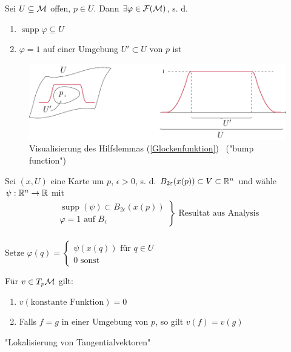 \begin{hlem}
Sei $U \subseteq \mathcal{M}$ offen, $p \in U$. Dann $\exists \varphi \in \mathcal{F}(\mathcal{M})$, s. d. 
\begin{enumerate}\label{Glockenfunktion}
\item$\operatorname{supp}\varphi\subseteq U$
\item$\varphi=1$ auf einer Umgebung $U' \subset U$ von $p$ ist
\end{enumerate}
\end{hlem}

\begin{figure}[H]
\centering 
\includegraphics[scale=0.8]{figures/tikz/bump_function.pdf}
\caption{Visualisierung des Hilfslemmas  (\ref{Glockenfunktion}) \  ("bump function") }
\end{figure}

\begin{bew}
Sei $(x, U)$ eine Karte um $p$, $\epsilon > 0$, s. d. $B_{2\varepsilon}(x(p))\subset V\subset \mathbb{R}^n$ und wähle $\psi:\mathbb{R}^n\rightarrow\mathbb{R}$ mit 
\begin{align*}
\left.
\begin{array}{r}
\operatorname{supp}(\psi)\subset B_{2\epsilon}(x(p))\\
\varphi = 1 \text{ auf } B_\epsilon
\end{array}
\right\} \text{ Resultat aus Analysis}\\
\end{align*}

Setze $\varphi(q) = \left\{
\begin{array}{l}
\psi(x(q))\text{ für }q\in U\\
0 \text{ sonst}
\end{array}
\right.$
\end{bew}

\begin{satz}
Für $v\in T_p \mathcal{M}$ gilt:
\begin{enumerate}
\item$v(\text{konstante Funktion}) = 0$
\item Falls $f = g$ in einer Umgebung von $p$, so gilt $v(f) = v(g)$
\end{enumerate}
"Lokalisierung von Tangentialvektoren"
\end{satz}

